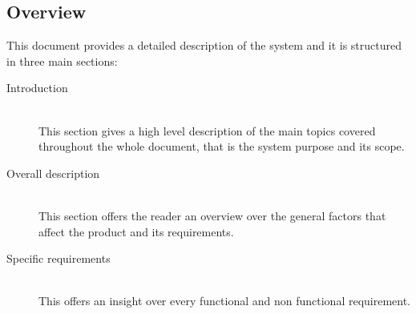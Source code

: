
\subsection{Overview}
This document provides a detailed description of the system and it is structured in three main sections:

\begin{description}
  \item[Introduction] \hfill \\
  This section gives a high level description of the main topics covered throughout the whole document, that is the system purpose and its scope.
  \item[Overall description] \hfill \\
  This section offers the reader an overview over the general factors that affect the product and its requirements.
  \item[Specific requirements] \hfill \\
  This offers an insight over every functional and non functional requirement.
\end{description}